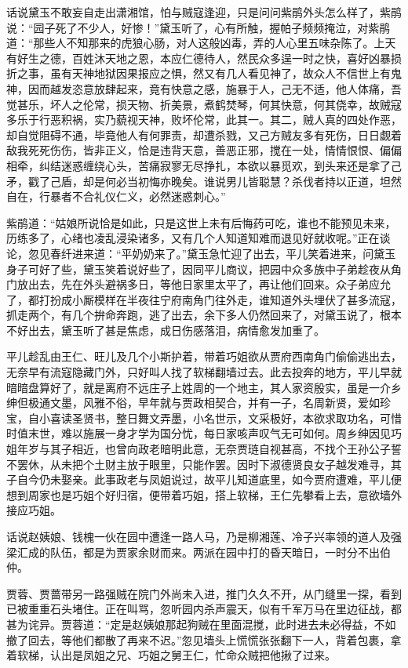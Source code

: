 \documentclass[12pt,oneside]{book}
\begin{document}
话说黛玉不敢妄自走出潇湘馆，怕与贼寇逢迎，只是问问紫鹃外头怎么样了，紫鹃说：“园子死了不少人，好惨！”黛玉听了，心有所触，握帕子频频掩泣，对紫鹃道：“那些人不知那来的虎狼心肠，对人这般凶毒，弄的人心里五味杂陈了。上天有好生之德，百姓沐天地之恩，本应仁德待人，然民众多逞一时之快，喜好凶暴损折之事，虽有天神地狱因果报应之惧，然又有几人看见神了，故众人不信世上有鬼神，因而越发恣意放肆起来，竟有快意之感，施暴于人，己无不适，他人体痛，吾觉甚乐，坏人之伦常，损天物、折美景，煮鹤焚琴，何其快意，何其侥幸，故贼寇多乐于行恶积祸，实乃藐视天神，败坏伦常，此其一。其二，贼人真的四处作恶，却自觉阻碍不通，毕竟他人有何罪责，却遭杀戮，又己方贼友多有死伤，日日觑着敌我死死伤伤，皆非正义，恰是违背天意，善恶正邪，搅在一处，情情恨恨、偏偏相牵，纠结迷惑缠绕心头，苦痛寂寥无尽挣扎，本欲以暴觅欢，到头来还是拿了己矛，戳了己盾，却是何必当初悔亦晚矣。谁说男儿皆聪慧？杀伐者持以正道，坦然自在，行暴者不合礼仪仁义，必然迷惑刺心。”

紫鹃道：“姑娘所说恰是如此，只是这世上未有后悔药可吃，谁也不能预见未来，历练多了，心绪也凌乱浸染诸多，又有几个人知道知难而退见好就收呢。”正在谈论，忽见春纤进来道：“平奶奶来了。”黛玉急忙迎了出去，平儿笑着进来，问黛玉身子可好了些，黛玉笑着说好些了，因同平儿商议，把园中众多族中子弟趁夜从角门放出去，先在外头避祸多日，等他日家里太平了，再让他们回来。众子弟应允了，都打扮成小厮模样在半夜往宁府南角门往外走，谁知道外头埋伏了甚多流寇，抓走两个，有几个拚命奔跑，逃了出去，余下多人仍然回来了，对黛玉说了，根本不好出去，黛玉听了甚是焦虑，成日伤感落泪，病情愈发加重了。

平儿趁乱由王仁、旺儿及几个小斯护着，带着巧姐欲从贾府西南角门偷偷逃出去，无奈早有流寇隐藏门外，只好叫人找了软梯翻墙过去。此去投奔的地方，平儿早就暗暗盘算好了，就是离府不远庄子上姓周的一个地主，其人家资殷实，虽是一介乡绅但极通文墨，风雅不俗，早年就与贾政相契合，并有一子，名周新贤，爱如珍宝，自小喜读圣贤书，整日舞文弄墨，小名世示，文采极好，本欲求取功名，可惜时值末世，难以施展一身才学为国分忧，每日家咳声叹气无可如何。周乡绅因见巧姐年岁与其子相近，也曾向政老暗明此意，无奈贾琏自视甚高，不找个王孙公子誓不罢休，从未把个土财主放于眼里，只能作罢。因时下淑德贤良女子越发难寻，其子自今仍未娶亲。此事政老与凤姐说过，故平儿知道底里，如今贾府遭难，平儿便想到周家也是巧姐个好归宿，便带着巧姐，搭上软梯，王仁先攀看上去，意欲墙外接应巧姐。

话说赵姨娘、钱槐一伙在园中遭逢一路人马，乃是柳湘莲、冷子兴率领的道人及强梁汇成的队伍，都是为贾家余财而来。两派在园中打的昏天暗日，一时分不出伯仲。

贾蓉、贾蔷带另一路强贼在院门外尚未入进，推门久久不开，从门缝里一探，看到已被重重石头堵住。正在叫骂，忽听园内杀声震天，似有千军万马在里边征战，都甚为诧异。贾蓉道：“定是赵姨娘那起狗贼在里面混搅，此时进去未必得益，不如撤了回去，等他们都散了再来不迟。”忽见墙头上慌慌张张翻下一人，背着包裹，拿着软梯，认出是凤姐之兄、巧姐之舅王仁，忙命众贼把他揪了过来。
\end{document}
